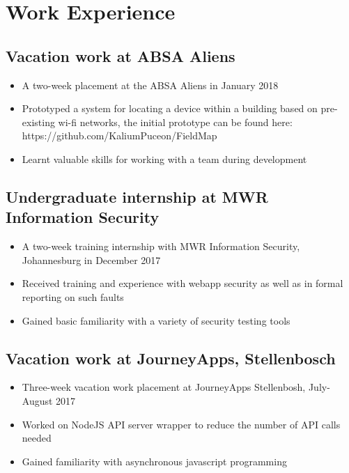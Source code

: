 \documentclass[12pt,a4paper,notitlepage]{article}
\begin{document}
\section*{Work Experience}

\subsection*{Vacation work at ABSA Aliens}
\begin{itemize}
    \item A two-week placement at the ABSA Aliens in January 2018
    \item Prototyped a system for locating a device within a building based on pre-existing wi-fi networks, the initial prototype can be found here:\\https://github.com/KaliumPuceon/FieldMap
    \item Learnt valuable skills for working with a team during development
\end{itemize}

\subsection*{Undergraduate internship at MWR Information Security}
\begin{itemize}
    \item A two-week training internship with MWR Information Security, Johannesburg in December 2017
    \item Received training and experience with webapp security as well as in formal reporting on such faults
    \item Gained basic familiarity with a variety of security testing tools
\end{itemize}

\subsection*{Vacation work at JourneyApps, Stellenbosch}
\begin{itemize}
    \item Three-week vacation work placement at JourneyApps Stellenbosh, July-August 2017
    \item Worked on NodeJS API server wrapper to reduce the number of API calls needed
    \item Gained familiarity with asynchronous javascript programming
\end{itemize}
\end{document}
